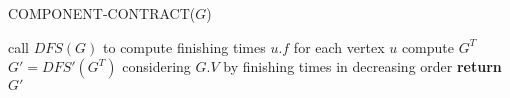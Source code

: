 \begin{algorithm}[H]
    \caption{COMPONENT-CONTRACT($G$)}\label{alg:cap2}
    \begin{algorithmic}[1]
        \State call $DFS(G)$ to compute finishing times $u.f$ for each vertex $u$
        \State compute $G^T$
        \State $G\mathcal{'} = DFS\mathcal{'}(G^T)$ considering $G.V$ by finishing times in decreasing order
        \State \textbf{return} $G\mathcal{'} $
    \end{algorithmic}
\end{algorithm}